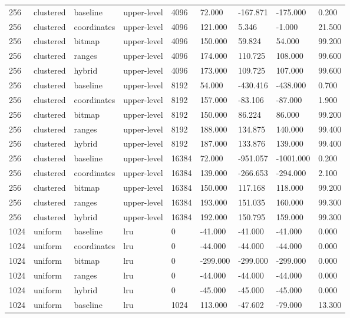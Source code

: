 \begin{tabular}{lllllllll}
256 & clustered & baseline & upper-level & 4096 & 72.000 & -167.871 & -175.000 & 0.200 \\
256 & clustered & coordinates & upper-level & 4096 & 121.000 & 5.346 & -1.000 & 21.500 \\
256 & clustered & bitmap & upper-level & 4096 & 150.000 & 59.824 & 54.000 & 99.200 \\
256 & clustered & ranges & upper-level & 4096 & 174.000 & 110.725 & 108.000 & 99.600 \\
256 & clustered & hybrid & upper-level & 4096 & 173.000 & 109.725 & 107.000 & 99.600 \\
256 & clustered & baseline & upper-level & 8192 & 54.000 & -430.416 & -438.000 & 0.700 \\
256 & clustered & coordinates & upper-level & 8192 & 157.000 & -83.106 & -87.000 & 1.900 \\
256 & clustered & bitmap & upper-level & 8192 & 150.000 & 86.224 & 86.000 & 99.200 \\
256 & clustered & ranges & upper-level & 8192 & 188.000 & 134.875 & 140.000 & 99.400 \\
256 & clustered & hybrid & upper-level & 8192 & 187.000 & 133.876 & 139.000 & 99.400 \\
256 & clustered & baseline & upper-level & 16384 & 72.000 & -951.057 & -1001.000 & 0.200 \\
256 & clustered & coordinates & upper-level & 16384 & 139.000 & -266.653 & -294.000 & 2.100 \\
256 & clustered & bitmap & upper-level & 16384 & 150.000 & 117.168 & 118.000 & 99.200 \\
256 & clustered & ranges & upper-level & 16384 & 193.000 & 151.035 & 160.000 & 99.300 \\
256 & clustered & hybrid & upper-level & 16384 & 192.000 & 150.795 & 159.000 & 99.300 \\
1024 & uniform & baseline & lru & 0 & -41.000 & -41.000 & -41.000 & 0.000 \\
1024 & uniform & coordinates & lru & 0 & -44.000 & -44.000 & -44.000 & 0.000 \\
1024 & uniform & bitmap & lru & 0 & -299.000 & -299.000 & -299.000 & 0.000 \\
1024 & uniform & ranges & lru & 0 & -44.000 & -44.000 & -44.000 & 0.000 \\
1024 & uniform & hybrid & lru & 0 & -45.000 & -45.000 & -45.000 & 0.000 \\
1024 & uniform & baseline & lru & 1024 & 113.000 & -47.602 & -79.000 & 13.300 \\

\end{tabular}
